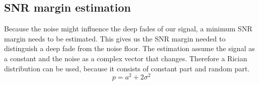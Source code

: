 \begin{where}
\end{where}



\subsection{SNR margin estimation}
\label{SNR_margin}
Because the noise might influence the deep fades of our signal, a minimum SNR margin needs to be estimated.
This gives us the SNR margin needed to distinguish a deep fade from the noise floor. %
The estimation assume the signal as a constant and the noise as a complex vector that changes. Therefore a Rician distribution can be used, because it consists of constant part and random part.
\begin{equation}
p = a^2 + 2\sigma^2
\end{equation}

